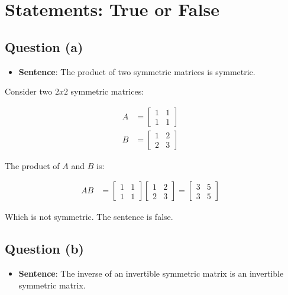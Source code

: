 \section{Statements: True or False}

	\subsection{Question (a)}
	
		\begin{itemize}
			\item{\textbf{Sentence}: The product of two symmetric matrices is symmetric.}
		\end{itemize}

		Consider two $2x2$ symmetric matrices:

		\begin{align}
			A &= \begin{bmatrix}
					1 & 1 \\[0.3em]
					1 & 1
				\end{bmatrix}& \\
			B &= \begin{bmatrix}
					1 & 2 \\[0.3em]
					2 & 3
				\end{bmatrix}&
		\label{eq:61a}
		\end{align}

		The product of $A$ and $B$ is:

		\begin{align}
			AB &= \begin{bmatrix}
					1 & 1 \\[0.3em]
					1 & 1
				\end{bmatrix}
				\begin{bmatrix}
					1 & 2 \\[0.3em]
					2 & 3
				\end{bmatrix} = 
				\begin{bmatrix}
					3 & 5 \\[0.3em]
					3 & 5
				\end{bmatrix}&
		\label{eq:61aproduct}
		\end{align}

		Which is not symmetric. The sentence is false.

	\subsection{Question (b)}

		\begin{itemize}
			\item{\textbf{Sentence}: The inverse of an invertible symmetric matrix is an invertible symmetric matrix.}
		\end{itemize}

